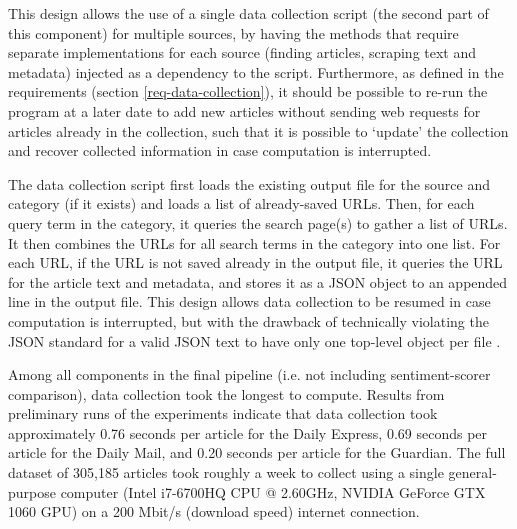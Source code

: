\documentclass{report}
\begin{document}
This design allows the use of a single data collection script (the second part of this component) for multiple sources, by having the methods that require separate implementations for each source (finding articles, scraping text and metadata) injected as a dependency to the script.
Furthermore, as defined in the requirements (section \ref{req-data-collection}), it should be possible to re-run the program at a later date to add new articles without sending web requests for articles already in the collection, such that it is possible to `update' the collection and recover collected information in case computation is interrupted.

The data collection script first loads the existing output file for the source and category (if it exists) and loads a list of already-saved URLs.
Then, for each query term in the category, it queries the search page(s) to gather a list of URLs.
It then combines the URLs for all search terms in the category into one list.
For each URL, if the URL is not saved already in the output file, it queries the URL for the article text and metadata, and stores it as a JSON object to an appended line in the output file.
This design allows data collection to be resumed in case computation is interrupted, but with the drawback of technically violating the JSON standard for a valid JSON text to have only one top-level object per file \cite{rfc8259}.

Among all components in the final pipeline (i.e. not including sentiment-scorer comparison), data collection took the longest to compute.
Results from preliminary runs of the experiments indicate that data collection took approximately 0.76 seconds per article for the Daily Express, 0.69 seconds per article for the Daily Mail, and 0.20 seconds per article for the Guardian.
The full dataset of 305,185 articles took roughly a week to collect using a single general-purpose computer (Intel i7-6700HQ CPU @ 2.60GHz, NVIDIA GeForce GTX 1060 GPU) on a 200 Mbit/s (download speed) internet connection.
\end{document}
